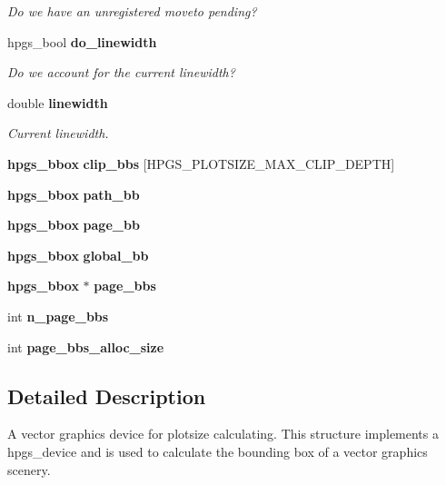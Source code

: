 \begin{DoxyCompactItemize}
\begin{DoxyCompactList}\small\item\em Do we have an unregistered moveto pending? \item\end{DoxyCompactList}\item 
hpgs\_\-bool {\bf do\_\-linewidth}\label{structhpgs__plotsize__device__st_ae8e92266b09da342dbd1f1cc26dd914d}

\begin{DoxyCompactList}\small\item\em Do we account for the current linewidth? \item\end{DoxyCompactList}\item 
double {\bf linewidth}\label{structhpgs__plotsize__device__st_ae18ef2c36ee97539c25b88dd1cbf4368}

\begin{DoxyCompactList}\small\item\em Current linewidth. \item\end{DoxyCompactList}\item 
{\bf hpgs\_\-bbox} {\bfseries clip\_\-bbs} [HPGS\_\-PLOTSIZE\_\-MAX\_\-CLIP\_\-DEPTH]\label{structhpgs__plotsize__device__st_ace813b5e80f82a23bfd48844c21bc67f}

\item 
{\bf hpgs\_\-bbox} {\bf path\_\-bb}
\item 
{\bf hpgs\_\-bbox} {\bf page\_\-bb}
\item 
{\bf hpgs\_\-bbox} {\bf global\_\-bb}
\end{DoxyCompactItemize}
\begin{Indent}{\bf }\par
{\em \label{_amgrpd41d8cd98f00b204e9800998ecf8427e}
 }\begin{DoxyCompactItemize}
\item 
{\bf hpgs\_\-bbox} $\ast$ {\bf page\_\-bbs}
\item 
int {\bf n\_\-page\_\-bbs}
\item 
int {\bfseries page\_\-bbs\_\-alloc\_\-size}\label{structhpgs__plotsize__device__st_a0d0a3522e149fdd32062286a75316d4a}

\end{DoxyCompactItemize}
\end{Indent}


\subsection{Detailed Description}
A vector graphics device for plotsize calculating. This structure implements a {\ttfamily hpgs\_\-device} and is used to calculate the bounding box of a vector graphics scenery. 

